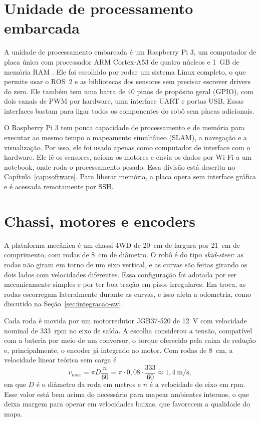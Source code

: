 \section{Unidade de processamento embarcada}

A unidade de processamento embarcada é um Raspberry Pi 3, um computador de
placa única com processador ARM Cortex-A53 de quatro núcleos e 1~GB de
memória RAM \cite{raspberrypi}. Ele foi escolhido por rodar um sistema
Linux completo, o que permite usar o ROS~2 e as bibliotecas dos sensores
sem precisar escrever drivers do zero. Ele também tem uma barra de 40
pinos de propósito geral (GPIO), com dois canais de PWM por hardware, uma
interface UART e portas USB. Essas interfaces bastam para ligar todos os
componentes do robô sem placas adicionais.

O Raspberry Pi 3 tem pouca capacidade de processamento e de memória para
executar ao mesmo tempo o mapeamento simultâneo (SLAM), a navegação e a
visualização. Por isso, ele foi usado apenas como computador de interface
com o hardware. Ele lê os sensores, aciona os motores e envia os dados por
Wi-Fi a um notebook, onde roda o processamento pesado. Essa divisão está
descrita no Capítulo~\ref{cap:software}. Para liberar memória, a placa
opera sem interface gráfica e é acessada remotamente por SSH.

\section{Chassi, motores e encoders}

A plataforma mecânica é um chassi 4WD de 20~cm de largura por 21~cm de
comprimento, com rodas de 8~cm de diâmetro. O robô é do tipo
\textit{skid-steer}: as rodas não giram em torno de um eixo vertical, e as
curvas são feitas girando os dois lados com velocidades diferentes. Essa
configuração foi adotada por ser mecanicamente simples e por ter boa tração
em pisos irregulares. Em troca, as rodas escorregam lateralmente durante
as curvas, e isso afeta a odometria, como discutido na
Seção~\ref{sec:integracao-sw}.

Cada roda é movida por um motorredutor JGB37-520 de 12~V com velocidade
nominal de 333~rpm no eixo de saída. A escolha considerou a tensão,
compatível com a bateria por meio de um conversor, o torque oferecido pela
caixa de redução e, principalmente, o encoder já integrado ao motor. Com
rodas de 8~cm, a velocidade linear teórica sem carga é
\begin{equation}
	\label{eq:vmax}
	v_{max} = \pi D \frac{n}{60} = \pi \cdot 0{,}08 \cdot \frac{333}{60}
	\approx 1{,}4~\mathrm{m/s},
\end{equation}
em que $D$ é o diâmetro da roda em metros e $n$ é a velocidade do eixo em
rpm. Esse valor está bem acima do necessário para mapear ambientes
internos, o que deixa margem para operar em velocidades baixas, que
favorecem a qualidade do mapa.

